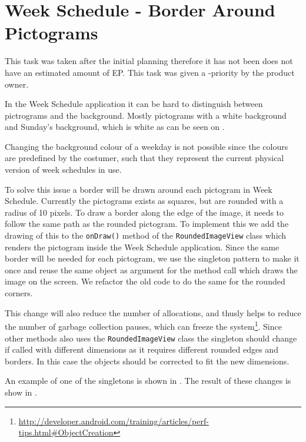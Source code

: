 \section{Week Schedule - Border Around Pictograms}
This task was taken after the initial planning therefore it has not been does not have an estimated amount of EP. 
This task was given a \phigh-priority by the product owner. 

In the Week Schedule application it can be hard to distinguish between pictrograms and the background.
Mostly pictograms with a white background and Sunday's background, which is white as can be seen on .

Changing the background colour of a weekday is not possible since the colours are predefined by the costumer, such that they represent the current physical version of week schedules in use.

To solve this issue a border will be drawn around each pictogram in Week Schedule.
Currently the pictograms exists as squares, but are rounded with a radius of 10 pixels.
To draw a border along the edge of the image, it needs to follow the same path as the rounded pictogram. 
To implement this we add the drawing of this to the \texttt{onDraw()} method of the \texttt{RoundedImageView} class which renders the pictogram inside the Week Schedule application. 
Since the same border will be needed for each pictogram, we use the singleton pattern to make it once and reuse the same object as argument for the method call which draws the image on the screen. 
We refactor the old code to do the same for the rounded corners. 

This change will also reduce the number of allocations, and  thusly helps to reduce the number of garbage collection pauses, which can freeze the system\footnote{\url{http://developer.android.com/training/articles/perf-tips.html\#ObjectCreation}}. 
Since other methods also uses the \texttt{RoundedImageView} class the singleton should change if called with different dimensions as it requires different rounded edges and borders. 
In this case the objects should be corrected to fit the new dimensions. 

An example of one of the singletons is shown in .
The result of these changes is show in . 

